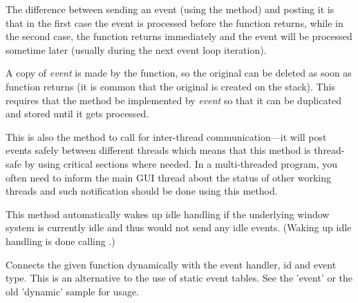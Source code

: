 The difference between sending an event (using the
 method) and posting it is
that in the first case the event is processed before the function returns,
while in the second case, the function returns immediately and the event will
be processed sometime later (usually during the next event loop iteration).

A copy of {\it event} is made by the function, so the original can be deleted
as soon as function returns (it is common that the original is created on the
stack).  This requires that the  method
be implemented by {\it event} so that it can be duplicated and stored until
it gets processed.

This is also the method to call for inter-thread communication---it will
post events safely between different threads which means that this method is
thread-safe by using critical sections where needed.  In a multi-threaded
program, you often need to inform the main GUI thread about the status of
other working threads and such notification should be done using this method.

This method automatically wakes up idle handling if the underlying window 
system is currently idle and thus would not send any idle events. (Waking
up idle handling is done calling .)

\label{wxevthandlerconnect}




Connects the given function dynamically with the event handler, id and event type. This
is an alternative to the use of static event tables. See the 'event' or the old 'dynamic' sample for usage.



